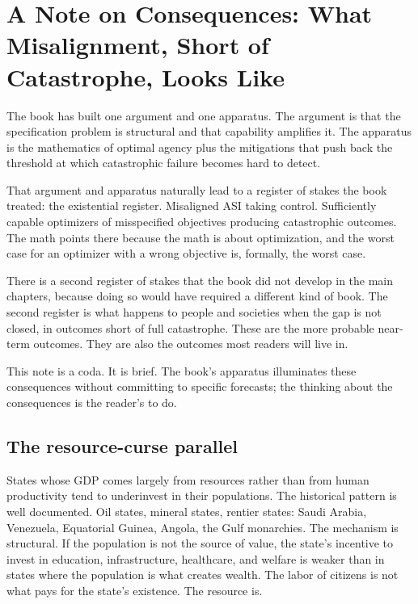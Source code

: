 \chapter*{A Note on Consequences: What Misalignment, Short of Catastrophe, Looks Like}

The book has built one argument and one apparatus. The argument is that the specification problem is structural and that capability amplifies it. The apparatus is the mathematics of optimal agency plus the mitigations that push back the threshold at which catastrophic failure becomes hard to detect.

That argument and apparatus naturally lead to a register of stakes the book treated: the existential register. Misaligned ASI taking control. Sufficiently capable optimizers of misspecified objectives producing catastrophic outcomes. The math points there because the math is about optimization, and the worst case for an optimizer with a wrong objective is, formally, the worst case.

There is a second register of stakes that the book did not develop in the main chapters, because doing so would have required a different kind of book. The second register is what happens to people and societies when the gap is not closed, in outcomes short of full catastrophe. These are the more probable near-term outcomes. They are also the outcomes most readers will live in.

This note is a coda. It is brief. The book's apparatus illuminates these consequences without committing to specific forecasts; the thinking about the consequences is the reader's to do.

\section*{The resource-curse parallel}

States whose GDP comes largely from resources rather than from human productivity tend to underinvest in their populations. The historical pattern is well documented. Oil states, mineral states, rentier states: Saudi Arabia, Venezuela, Equatorial Guinea, Angola, the Gulf monarchies. The mechanism is structural. If the population is not the source of value, the state's incentive to invest in education, infrastructure, healthcare, and welfare is weaker than in states where the population is what creates wealth. The labor of citizens is not what pays for the state's existence. The resource is.

